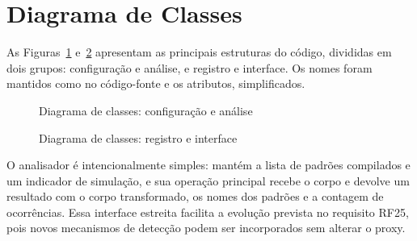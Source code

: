 \section{Diagrama de Classes}
\label{sec:proj_classes}

As Figuras~\ref{fig:classes_a} e~\ref{fig:classes_b} apresentam as principais estruturas do código, divididas em dois grupos: configuração e análise, e registro e interface. Os nomes foram mantidos como no código-fonte e os atributos, simplificados.

\begin{figure}[htb]
\centering
\caption{Diagrama de classes: configuração e análise}\label{fig:classes_a}
\end{figure}

\begin{figure}[htb]
\centering
\caption{Diagrama de classes: registro e interface}\label{fig:classes_b}
\end{figure}

O analisador é intencionalmente simples: mantém a lista de padrões compilados e um indicador de simulação, e sua operação principal recebe o corpo e devolve um resultado com o corpo transformado, os nomes dos padrões e a contagem de ocorrências. Essa interface estreita facilita a evolução prevista no requisito RF25, pois novos mecanismos de detecção podem ser incorporados sem alterar o proxy.
